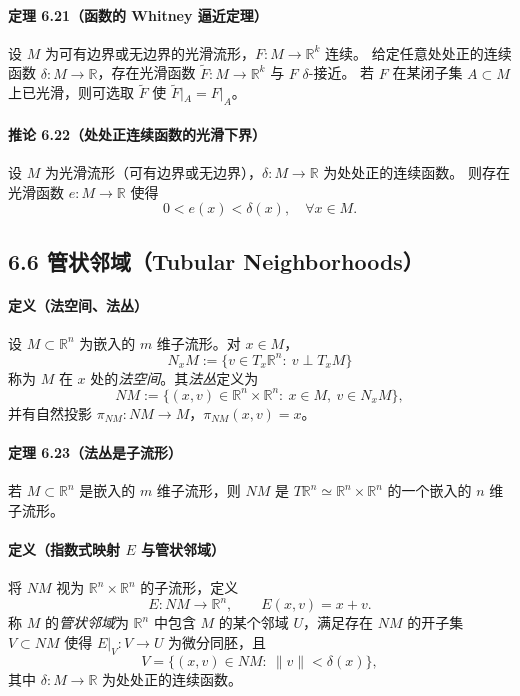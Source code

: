 \documentclass[11pt,a4paper]{article}
\begin{document}
\paragraph{定理 6.21（函数的 Whitney 逼近定理）}
设 $M$ 为可有边界或无边界的光滑流形，$F:M\to\mathbb R^k$ 连续。
给定任意处处正的连续函数 $\delta:M\to\mathbb R$，存在光滑函数
$\widetilde F:M\to\mathbb R^k$ 与 $F$ $\delta$-接近。
若 $F$ 在某闭子集 $A\subset M$ 上已光滑，则可选取 $\widetilde F$ 使 $\widetilde F|_A=F|_A$。

\paragraph{推论 6.22（处处正连续函数的光滑下界）}
设 $M$ 为光滑流形（可有边界或无边界），$\delta:M\to\mathbb R$ 为处处正的连续函数。
则存在光滑函数 $e:M\to\mathbb R$ 使得
\[
0<e(x)<\delta(x),\quad \forall x\in M.
\]

\subsection*{6.6 管状邻域（Tubular Neighborhoods）}

\paragraph{定义（法空间、法丛）}
设 $M\subset\mathbb R^n$ 为嵌入的 $m$ 维子流形。对 $x\in M$，
\[
N_xM:=\{v\in T_x\mathbb R^n:\ v\perp T_xM\}
\]
称为 $M$ 在 $x$ 处的\emph{法空间}。其\emph{法丛}定义为
\[
NM:=\{(x,v)\in \mathbb R^n\times\mathbb R^n:\ x\in M,\ v\in N_xM\},
\]
并有自然投影 $\pi_{NM}:NM\to M$，$\pi_{NM}(x,v)=x$。

\paragraph{定理 6.23（法丛是子流形）}
若 $M\subset\mathbb R^n$ 是嵌入的 $m$ 维子流形，则 $NM$ 是
$T\mathbb R^n\simeq \mathbb R^n\times\mathbb R^n$ 的一个嵌入的 $n$ 维子流形。

\paragraph{定义（指数式映射 $E$ 与管状邻域）}
将 $NM$ 视为 $\mathbb R^n\times\mathbb R^n$ 的子流形，定义
\[
E:NM\to\mathbb R^n,\qquad E(x,v)=x+v.
\]
称 $M$ 的\emph{管状邻域}为 $\mathbb R^n$ 中包含 $M$ 的某个邻域 $U$，满足存在 $NM$ 的开子集
$V\subset NM$ 使得 $E|_V:V\to U$ 为微分同胚，且
\[
V=\{(x,v)\in NM:\ \|v\|<\delta(x)\},
\]
其中 $\delta:M\to\mathbb R$ 为处处正的连续函数。
\end{document}
